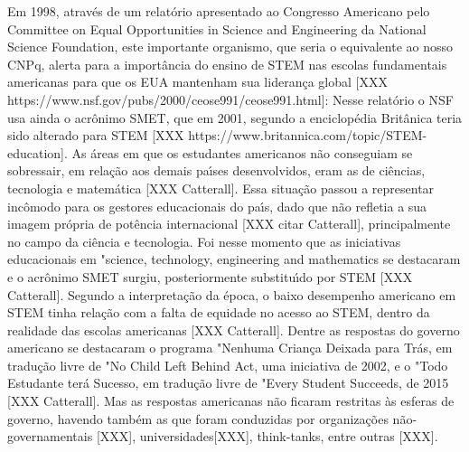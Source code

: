 \documentclass[
12pt,		%
openright,	%
twoside,  %
a4paper,			%
chapter=TITLE,		%
english,			%
french,				%
spanish,			%
brazil				%
]{USPSC-classe/USPSC}
\begin{document}
Em 1998, atrav\'es de um relat\'orio apresentado ao Congresso Americano pelo Committee on Equal Opportunities in Science and Engineering da National Science Foundation, este importante organismo, que seria o equivalente ao nosso CNPq, alerta para a import\^ancia do ensino de STEM nas escolas fundamentais americanas para que os EUA mantenham sua lideran\c{c}a global [XXX https://www.nsf.gov/pubs/2000/ceose991/ceose991.html]:
Nesse relat\'orio o NSF usa ainda o acr\^onimo SMET, que em 2001, segundo a enciclop\'edia Brit\^anica teria sido alterado para STEM [XXX https://www.britannica.com/topic/STEM-education].
As \'areas em que os estudantes americanos n\~ao conseguiam se sobressair, em rela\c{c}\~ao aos demais pa\'{\i}ses desenvolvidos, eram as de ci\^encias, tecnologia e matem\'atica [XXX Catterall]. Essa situa\c{c}\~ao passou a representar inc\^omodo para os gestores educacionais do pa\'{\i}s, dado que n\~ao refletia a sua imagem pr\'opria de pot\^encia internacional [XXX citar Catterall], principalmente no campo da ci\^encia e tecnologia. Foi nesse momento que as iniciativas educacionais em "science, technology, engineering and mathematics se destacaram e o acr\^onimo SMET surgiu, posteriormente substitu\'{\i}do por STEM [XXX  Catterall].
Segundo a interpreta\c{c}\~ao da \'epoca, o baixo desempenho americano em STEM tinha rela\c{c}\~ao com a falta de equidade no acesso ao STEM, dentro da realidade das escolas americanas [XXX Catterall].
Dentre as respostas do governo americano se destacaram o programa "Nenhuma Crian\c{c}a Deixada para Tr\'as, em tradu\c{c}\~ao livre de "No Child Left Behind Act, uma iniciativa de 2002, e o "Todo Estudante ter\'a Sucesso, em tradu\c{c}\~ao livre de "Every Student Succeeds, de 2015 [XXX Catterall].
Mas as respostas americanas n\~ao ficaram restritas \`as esferas de governo, havendo tamb\'em as que foram conduzidas por organiza\c{c}\~oes n\~ao-governamentais [XXX], universidades[XXX], think-tanks, entre outras [XXX].
\end{document}
